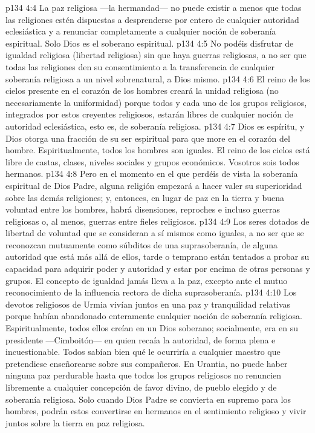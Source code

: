 \vs p134 4:4 La paz religiosa ---la hermandad--- no puede existir a menos que todas las religiones estén dispuestas a desprenderse por entero de cualquier autoridad eclesiástica y a renunciar completamente a cualquier noción de soberanía espiritual. Solo Dios es el soberano espiritual.
\vs p134 4:5 No podéis disfrutar de igualdad religiosa (libertad religiosa) sin que haya guerras religiosas, a no ser que todas las religiones den su consentimiento a la transferencia de cualquier soberanía religiosa a un nivel sobrenatural, a Dios mismo.
\vs p134 4:6 El reino de los cielos presente en el corazón de los hombres creará la unidad religiosa (no necesariamente la uniformidad) porque todos y cada uno de los grupos religiosos, integrados por estos creyentes religiosos, estarán libres de cualquier noción de autoridad eclesiástica, esto es, de soberanía religiosa.
\vs p134 4:7 Dios es espíritu, y Dios otorga una fracción de su ser espiritual para que more en el corazón del hombre. Espiritualmente, todos los hombres son iguales. El reino de los cielos está libre de castas, clases, niveles sociales y grupos económicos. Vosotros sois todos hermanos.
\vs p134 4:8 Pero en el momento en el que perdéis de vista la soberanía espiritual de Dios Padre, alguna religión empezará a hacer valer su superioridad sobre las demás religiones; y, entonces, en lugar de paz en la tierra y buena voluntad entre los hombres, habrá disensiones, reproches e incluso guerras religiosas o, al menos, guerras entre fieles religiosos.
\vs p134 4:9 Los seres dotados de libertad de voluntad que se consideran a sí mismos como iguales, a no ser que se reconozcan mutuamente como súbditos de una suprasoberanía, de alguna autoridad que está más allá de ellos, tarde o temprano están tentados a probar su capacidad para adquirir poder y autoridad y estar por encima de otras personas y grupos. El concepto de igualdad jamás lleva a la paz, excepto ante el mutuo reconocimiento de la influencia rectora de dicha suprasoberanía.
\vs p134 4:10 Los devotos religiosos de Urmia vivían juntos en una paz y tranquilidad relativas porque habían abandonado enteramente cualquier noción de soberanía religiosa. Espiritualmente, todos ellos creían en un Dios soberano; socialmente, era en su presidente ---Cimboitón--- en quien recaía la autoridad, de forma plena e incuestionable. Todos sabían bien qué le ocurriría a cualquier maestro que pretendiese enseñorearse sobre sus compañeros. En Urantia, no puede haber ninguna paz perdurable hasta que todos los grupos religiosos no renuncien libremente a cualquier concepción de favor divino, de pueblo elegido y de soberanía religiosa. Solo cuando Dios Padre se convierta en supremo para los hombres, podrán estos convertirse en hermanos en el sentimiento religioso y vivir juntos sobre la tierra en paz religiosa.
